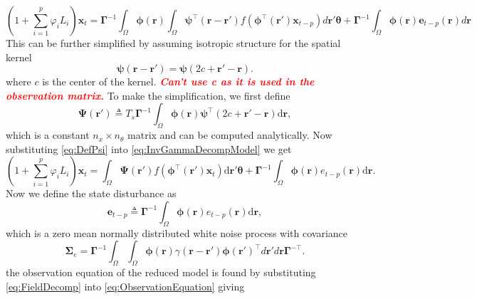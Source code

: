 \documentclass[a4paper,10pt]{article}
\newcommand{\dean}[1]{\textsf{\emph{\textbf{\textcolor{red}{#1}}}}}
\begin{document}
\begin{equation}\label{eq:InvGammaDecompModel}
 (1+\sum_{i=1}^{p}\varphi_i L_i) \mathbf{x}_t=\boldsymbol\Gamma^{-1}\int_{\Omega}\boldsymbol \phi(\mathbf r)\int_{\Omega}\boldsymbol{\psi}^\top\left(\mathbf{r}-\mathbf{r}'\right) f(\boldsymbol{\phi}^{\top}\left(\mathbf{r'}\right) \mathbf{x}_{t-p})d\mathbf r'\boldsymbol{\theta}+\boldsymbol\Gamma^{-1}\int_{\Omega}\boldsymbol\phi(\mathbf r)\mathbf e_{t-p}(\mathbf r)d\mathbf r
\end{equation}
This can be further simplified by assuming isotropic structure for the spatial kernel
\begin{equation}
	\boldsymbol{\psi} (\mathbf{r}-\mathbf{r}') = \boldsymbol{\psi} (2c+\mathbf{r}'-\mathbf{r}).
\end{equation}
where $c$ is the center of the kernel. \dean{Can't use c as it is used in the observation matrix.} To make the simplification, we first define
\begin{equation}\label{eq:DefPsi}
	\boldsymbol{\Psi}(\mathbf{r}') \triangleq T_s\boldsymbol{\Gamma}^{-1}\int_\Omega {\boldsymbol{\phi}(\mathbf{r})\boldsymbol{\psi}^{\top} (2c+\mathbf{r}'-\mathbf{r})\textrm{d}\mathbf{r}},
\end{equation}
which is a constant $n_x \times n_{\theta}$ matrix and can be computed analytically. Now substituting \eqref{eq:DefPsi} into \eqref{eq:InvGammaDecompModel} we get
\begin{equation}
(1+\sum_{i=1}^{p}\varphi_i L_i) \mathbf{x}_t = \int_\Omega \boldsymbol{\Psi}(\mathbf{r}') f(\boldsymbol{\phi}^{\top}(\mathbf{r}')\mathbf{x}_t) \textrm{d}\mathbf{r}' \boldsymbol{\theta}
+ \boldsymbol{\Gamma}^{-1} \int_\Omega{\boldsymbol{\phi}(\mathbf{r})e_{t-p}(\mathbf{r})\textrm{d}\mathbf{r}}.
\end{equation}
Now we define the state disturbance as
\begin{equation}\label{eq:Wt} 
	\mathbf{e}_{t-p} \triangleq \boldsymbol{\Gamma}^{-1}\int_\Omega {\boldsymbol{\phi} ( \mathbf{r} )e_{t-p}( \mathbf{r} )\textrm{d}\mathbf{r}},
\end{equation}
which is a zero mean normally distributed white noise process with covariance
\begin{equation}
	\boldsymbol\Sigma_e =\mathbf{\Gamma}^{-1}\int_{\Omega}\int_{\Omega}\boldsymbol{\phi}\left(\mathbf r\right) \gamma\left(\mathbf r- \mathbf r' \right)\boldsymbol{\phi}\left(\mathbf r'\right)^{\top}d\mathbf r' d\mathbf r\mathbf{\Gamma}^{- \top}. 
\end{equation}
the observation equation of the reduced model is found by substituting \eqref{eq:FieldDecomp} into \eqref{eq:ObservationEquation} giving
\end{document}
